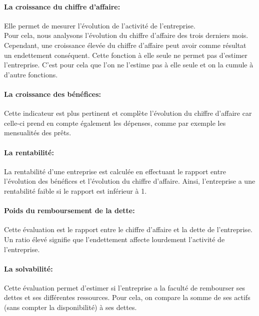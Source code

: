 \paragraph{La croissance du chiffre d’affaire:}
Elle permet de mesurer l’évolution de l'activité de l’entreprise. \\
Pour cela, nous analysons l’évolution du chiffre d’affaire des trois derniers mois.
Cependant, une croissance élevée du chiffre d’affaire peut avoir comme résultat un endettement conséquent. Cette fonction à elle seule ne permet pas d’estimer l’entreprise. C’est pour cela que l’on ne l’estime pas à elle seule et on la cumule à d’autre fonctions.



\paragraph{La croissance des bénéfices:}
Cette indicateur est plus pertinent et complète l’évolution du chiffre d’affaire car celle-ci prend en compte également les dépenses, comme par exemple les mensualités des prêts.



\paragraph{La rentabilité:}
La rentabilité d’une entreprise est calculée en effectuant le rapport entre l’évolution des bénéfices et l’évolution du chiffre d’affaire.
Ainsi, l’entreprise a une rentabilité faible si le rapport est inférieur à 1.



\paragraph{Poids du remboursement de la dette:}
Cette évaluation est le rapport entre le chiffre d’affaire et la dette de l’entreprise.
Un ratio élevé signifie que l’endettement affecte lourdement l’activité de l’entreprise.



\paragraph{La solvabilité:}
Cette évaluation permet d’estimer si l'entreprise a la faculté de rembourser ses dettes et ses différentes ressources.
Pour cela, on compare la somme de ses actifs (sans compter la disponibilité) à ses dettes.



